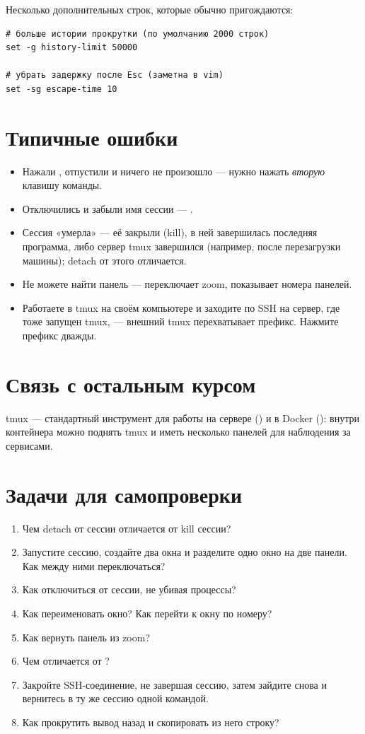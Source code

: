 Несколько дополнительных строк, которые обычно пригождаются:
\begin{verbatim}
# больше истории прокрутки (по умолчанию 2000 строк)
set -g history-limit 50000

# убрать задержку после Esc (заметна в vim)
set -sg escape-time 10
\end{verbatim}

\section{Типичные ошибки}
\begin{itemize}
  \item Нажали , отпустили и ничего не произошло ---
    нужно нажать \emph{вторую} клавишу команды.
  \item Отключились и забыли имя сессии --- .
  \item Сессия «умерла» --- её закрыли (kill), в ней завершилась
    последняя программа, либо сервер tmux завершился (например,
    после перезагрузки машины); detach от этого отличается.
  \item Не можете найти панель ---  переключает
    zoom,  показывает номера панелей.
  \item Работаете в tmux на своём компьютере и заходите по SSH на
    сервер, где тоже запущен tmux, --- внешний tmux перехватывает
    префикс. Нажмите префикс дважды.
\end{itemize}

\section{Связь с остальным курсом}

tmux --- стандартный инструмент для работы на сервере
() и в Docker
(): внутри контейнера можно
поднять tmux и иметь несколько панелей для наблюдения
за сервисами.

\section{Задачи для самопроверки}
\begin{enumerate}
  \item Чем detach от сессии отличается от kill сессии?
  \item Запустите сессию, создайте два окна и разделите одно
    окно на две панели. Как между ними переключаться?
  \item Как отключиться от сессии, не убивая процессы?
  \item Как переименовать окно? Как перейти к окну по номеру?
  \item Как вернуть панель из zoom?
  \item Чем \cmd{\%} отличается от \cmd{\textquotedbl}?
  \item Закройте SSH-соединение, не завершая сессию, затем зайдите
    снова и вернитесь в ту же сессию одной командой.
  \item Как прокрутить вывод назад и скопировать из него строку?
\end{enumerate}
